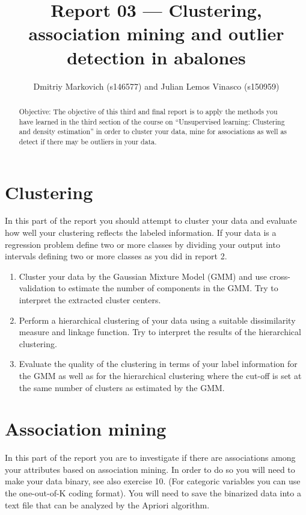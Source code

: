 \documentclass[10pt, paper=a4]{article}
\begin{document}
\title{Report 03 --- Clustering, association mining and outlier detection in
  abalones}

\author{Dmitriy Markovich (s146577) and Julian Lemos Vinasco (s150959)}

\date{}

\maketitle

\begin{abstract}
Objective: The objective of this third and final report is to apply the methods
you have learned in the third section of the course on ``Unsupervised learning:
Clustering and density estimation'' in order to cluster your data, mine for
associations as well as detect if there may be outliers in your data.
\end{abstract}

\section{Clustering}
\label{sec:clustering}
In this part of the report you should attempt to cluster your data and evaluate
how well your clustering reflects the labeled information. If your data is a
regression problem define two or more classes by dividing your output into
intervals defining two or more classes as you did in report 2.

\begin{enumerate}
  \item Cluster your data by the Gaussian Mixture Model (GMM) and use cross-
    validation to estimate the number of components in the GMM. Try to interpret
    the extracted cluster centers.
  \item Perform a hierarchical clustering of your data using a suitable
    dissimilarity measure and linkage function. Try to interpret the results of
    the hierarchical clustering.
  \item Evaluate the quality of the clustering in terms of your label
    information for the GMM as well as for the hierarchical clustering where the
    cut-off is set at the same number of clusters as estimated by the GMM.
\end{enumerate}

\section{Association mining}
\label{sec:association}
In this part of the report you are to investigate if there are associations
among your attributes based on association mining. In order to do so you will
need to make your data binary, see also exercise 10. (For categoric variables
you can use the one-out-of-K coding format). You will need to save the binarized
data into a text file that can be analyzed by the Apriori algorithm.
\end{document}
